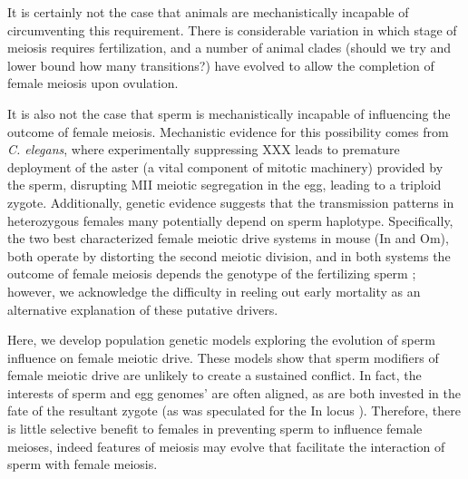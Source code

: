 \documentclass[12pt,letterpaper]{article}
\newcommand{\yb}[1]{{ \color{blue} #1}}
\begin{document}
It is certainly not the case that animals are mechanistically incapable of \yb{circumventing} this requirement.
There is considerable variation in which stage of meiosis requires fertilization, and 
a number of animal clades (should we try and lower bound how many transitions?) have evolved
to allow the completion of female meiosis upon ovulation. 

It is also not the case that sperm is mechanistically incapable of influencing the outcome of female meiosis.
Mechanistic evidence for this possibility comes from
\emph{C. elegans}, where experimentally suppressing XXX leads to
premature deployment of the aster (a vital component of mitotic
machinery) provided by the sperm, disrupting MII meiotic segregation in the egg, leading to a triploid zygote. 
Additionally, genetic evidence suggests that the transmission patterns
in heterozygous females many potentially depend on sperm haplotype. 
Specifically, the two best characterized female meiotic drive systems in mouse (In and Om), both operate by distorting the second meiotic division, 
and in both systems the outcome of female meiosis depends the genotype of the fertilizing sperm \citep{Agulnik1993,Wu2005}; 
	\yb{however,  we acknowledge the difficulty in reeling out early mortality as an alternative explanation of these putative drivers}.


Here, we develop population genetic models exploring the evolution of \yb{sperm influence on female meiotic drive}. 
These models show that \yb{sperm modifiers of female meiotic drive are unlikely to create a sustained conflict.} 
In fact, the interests of sperm and egg  genomes' are often aligned, as are both invested in the fate of the resultant zygote 
	(as was speculated for the In locus \citep{Pomiankowski1993}).
Therefore, there is little selective benefit to females in preventing sperm to influence female meioses,
	indeed features of meiosis may evolve that facilitate the interaction of sperm with female meiosis. 
\end{document}
